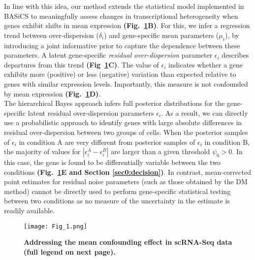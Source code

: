 In line with this idea, our method extends the statistical model implemented in BASiCS \citep{Vallejos2015BASiCS, Vallejos2016} to meaningfully assess changes in transcriptional heterogeneity when genes exhibit shifts in mean expression \textbf{(Fig.~\ref{fig2:Schematic_model}B)}. For this, we infer a regression trend between over-dispersion ($\delta_i$) and gene-specific mean parameters ($\mu_i$), by introducing a joint informative prior to capture the dependence between these parameters. A latent gene-specific \textit{residual over-dispersion} parameter $\epsilon_i$ describes departures from this trend \textbf{(Fig~\ref{fig2:Schematic_model}C)}. The value of $\epsilon_i$ indicates whether a gene exhibits more (positive) or less (negative) variation than expected relative to genes with similar expression levels. Importantly, this measure is not confounded by mean expression \textbf{(Fig.~\ref{fig2:Schematic_model}D)}. \\

The hierarchical Bayes approach infers full posterior distributions for the gene-specific latent residual over-dispersion parameters $\epsilon_i$. As a result, we can directly use a probabilistic approach to identify genes with large absolute differences in residual over-dispersion between two groups of cells. When the posterior samples of $\epsilon_i$ in condition A are very different from posterior samples of $\epsilon_i$ in condition B, the majority of values for $|\epsilon_i^A - \epsilon_i^B|$ are larger than a given threshold $\psi_0>0$. In this case, the gene is found to be differentially variable between the two conditions  \textbf{(Fig.~\ref{fig2:Schematic_model}E and Section \ref{sec0:decision})}. In contrast, mean-corrected point estimates for residual noise parameters (such as those obtained by the DM method) cannot be directly used to perform gene-specific statistical testing between two conditions as no measure of the uncertainty in the estimate is readily available.\\

\newpage

\begin{figure}[!h]
\centering
\texttt{[image: Fig\_1.png]}
\caption[Addressing the mean confounding effect in scRNA-Seq data]{\textbf{Addressing the mean confounding effect in scRNA-Seq data (full legend on next page).}\\}
\label{fig2:Schematic_model}
\end{figure}

\newpage

